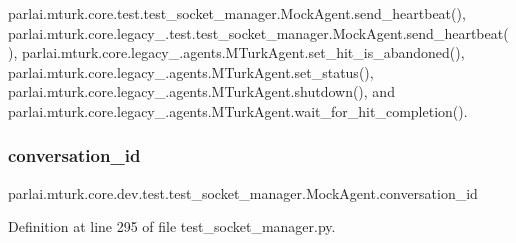 parlai.\+mturk.\+core.\+test.\+test\+\_\+socket\+\_\+manager.\+Mock\+Agent.\+send\+\_\+heartbeat(), parlai.\+mturk.\+core.\+legacy\+\_.\+test.\+test\+\_\+socket\+\_\+manager.\+Mock\+Agent.\+send\+\_\+heartbeat(), parlai.\+mturk.\+core.\+legacy\+\_.\+agents.\+M\+Turk\+Agent.\+set\+\_\+hit\+\_\+is\+\_\+abandoned(), parlai.\+mturk.\+core.\+legacy\+\_.\+agents.\+M\+Turk\+Agent.\+set\+\_\+status(), parlai.\+mturk.\+core.\+legacy\+\_.\+agents.\+M\+Turk\+Agent.\+shutdown(), and parlai.\+mturk.\+core.\+legacy\+\_.\+agents.\+M\+Turk\+Agent.\+wait\+\_\+for\+\_\+hit\+\_\+completion().

\mbox{\label{classparlai_1_1mturk_1_1core_1_1dev_1_1test_1_1test__socket__manager_1_1MockAgent_a21ba5d90cf3547f6189e7d2177af8121}} 
\subsubsection{\texorpdfstring{conversation\+\_\+id}{conversation\_id}}
{\footnotesize\ttfamily parlai.\+mturk.\+core.\+dev.\+test.\+test\+\_\+socket\+\_\+manager.\+Mock\+Agent.\+conversation\+\_\+id}



Definition at line 295 of file test\+\_\+socket\+\_\+manager.\+py.



